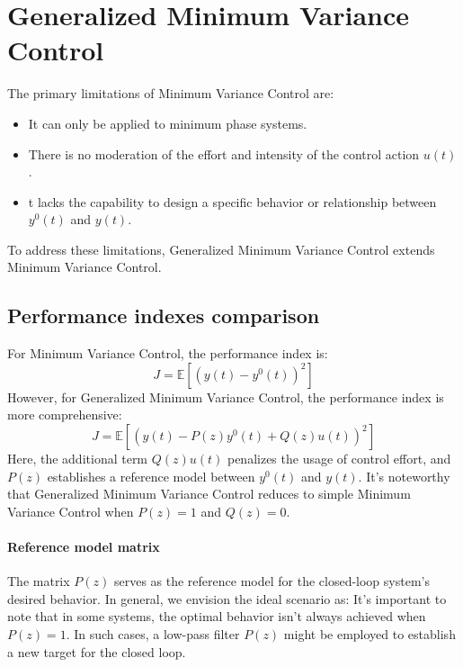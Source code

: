 \section{Generalized Minimum Variance Control}

The primary limitations of Minimum Variance Control are:
\begin{itemize}
    \item It can only be applied to minimum phase systems.
    \item There is no moderation of the effort and intensity of the control action $u(t)$. 
    \item t lacks the capability to design a specific behavior or relationship between $y^{0}(t)$ and $y(t)$. 
\end{itemize}
To address these limitations, Generalized Minimum Variance Control extends Minimum Variance Control.

\subsection{Performance indexes comparison}
For Minimum Variance Control, the performance index is:
\[J=\mathbb{E}\left[\left(y(t)-y^{0}(t)\right)^2\right]\]
However, for Generalized Minimum Variance Control, the performance index is more comprehensive:
\[J=\mathbb{E}\left[\left(y(t)-P(z)y^{0}(t)+Q(z)u(t)\right)^2\right]\]
Here, the additional term $Q(z)u(t)$ penalizes the usage of control effort, and $P(z)$ establishes a reference model between $y^{0}(t)$ and $y(t)$. 
It's noteworthy that Generalized Minimum Variance Control reduces to simple Minimum Variance Control when $P(z)=1$ and $Q(z)=0$. 

\paragraph*{Reference model matrix}
The matrix $P(z)$ serves as the reference model for the closed-loop system's desired behavior. 
In general, we envision the ideal scenario as:
It's important to note that in some systems, the optimal behavior isn't always achieved when $P(z)=1$. 
In such cases, a low-pass filter $P(z)$ might be employed to establish a new target for the closed loop.